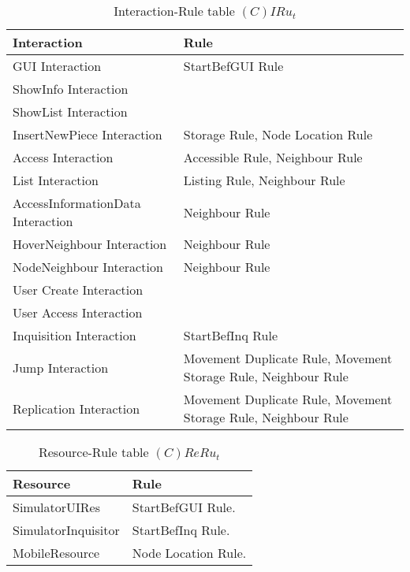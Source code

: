\begin{table}[H]
	\centering
	\begin{tabular}{|p{4cm}|p{8cm}|}
			\hline
			\textbf{Interaction} & \textbf{Rule} \\
			\hline
			GUI Interaction & StartBefGUI Rule\\
			\hline
			ShowInfo Interaction & \\
			\hline
			ShowList Interaction & \\
			\hline
			InsertNewPiece Interaction & Storage Rule, Node Location Rule \\
			\hline
			Access Interaction & Accessible Rule, Neighbour Rule \\
			\hline
			List Interaction & Listing Rule, Neighbour Rule \\
			\hline
			AccessInformationData Interaction & Neighbour Rule\\
			\hline
			HoverNeighbour Interaction & Neighbour Rule\\
			\hline
			NodeNeighbour Interaction & Neighbour Rule\\
			\hline
			User Create Interaction & \\
			\hline
			User Access Interaction & \\
			\hline
			Inquisition Interaction & StartBefInq Rule \\
			\hline
			Jump Interaction & Movement Duplicate Rule, Movement Storage Rule, Neighbour Rule \\
			\hline
			Replication Interaction & Movement Duplicate Rule, Movement Storage Rule, Neighbour Rule \\
			\hline
		\end{tabular}
	\caption{Interaction-Rule table $(C)IRu_t$}
	\label{tab:cirut}
\end{table}

\begin{table}[H]
	\centering
	\begin{tabular}{|p{4cm}|p{8cm}|}
			\hline
			\textbf{Resource} & \textbf{Rule} \\
			\hline
			SimulatorUIRes & StartBefGUI Rule. \\
			\hline
			SimulatorInquisitor & StartBefInq Rule. \\
			\hline
			MobileResource & Node Location Rule. \\
			\hline
		\end{tabular}
	\caption{Resource-Rule table $(C)ReRu_t$}
	\label{tab:crerut}
\end{table}

